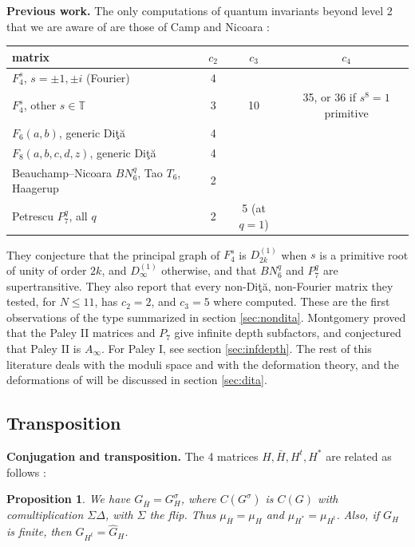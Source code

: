 \documentclass[11pt]{amsart}
\newtheorem{proposition}[theorem]{Proposition}
\newcommand{\T}{\mathbb T}
\begin{document}
\medskip

\noindent\textbf{Previous work.} The only computations of quantum invariants beyond level 2 that we are aware of are those of Camp and Nicoara \cite{cn,ni}:

\medskip

\begin{center}
\begin{tabular}{lccc}
\toprule
matrix & $c_2$ & $c_3$ & $c_4$\\
\midrule
$F_4^s$, $s=\pm1,\pm i$ (Fourier) & 4 & & \\
$F_4^s$, other $s\in\T$ & 3 & 10 & 35, or 36 if $s^8=1$ primitive\\
$F_6(a,b)$, generic Di\c t\u a & 4 & & \\
$F_8(a,b,c,d,z)$, generic Di\c t\u a & 4 & & \\
Beauchamp--Nicoara $BN_6^q$, Tao $T_6$, Haagerup & 2 & & \\
Petrescu $P_7^q$, all $q$ & 2 & 5 (at $q=1$) & \\
\bottomrule
\end{tabular}
\end{center}

\medskip

\noindent They conjecture that the principal graph of $F_4^s$ is $D_{2k}^{(1)}$ when $s$ is a primitive root of unity of order $2k$, and $D_\infty^{(1)}$ otherwise, and that $BN_6^q$ and $P_7^q$ are supertransitive. They also report that every non-Di\c t\u a, non-Fourier matrix they tested, for $N\leq11$, has $c_2=2$, and $c_3=5$ where computed. These are the first observations of the type summarized in section \ref{sec:nondita}. Montgomery \cite{mo2,mo3} proved that the Paley II matrices and $P_7$ give infinite depth subfactors, and conjectured that Paley II is $A_\infty$. For Paley I, see section \ref{sec:infdepth}. The rest of this literature \cite{fnw,hn1,hn2,ho,hw,nw1,nw2,nw4,nwo,sch,whi} deals with the moduli space and with the deformation theory, and the deformations of \cite{nwh,wor} will be discussed in section \ref{sec:dita}.

\subsection{Transposition}\label{sec:transp}

\noindent\textbf{Conjugation and transposition.} The 4 matrices $H,\bar{H},H^t,H^*$ are related as follows \cite{ba0,ba5}:

\begin{proposition}\label{prop:conj}
We have $G_{\bar{H}}=G_H^\sigma$, where $C(G^\sigma)$ is $C(G)$ with comultiplication $\Sigma\Delta$, with $\Sigma$ the flip. Thus $\mu_{\bar{H}}=\mu_H$ and $\mu_{H^*}=\mu_{H^t}$. Also, if $G_H$ is finite, then $G_{H^t}=\widehat{G}_H$.
\end{proposition}
\end{document}
